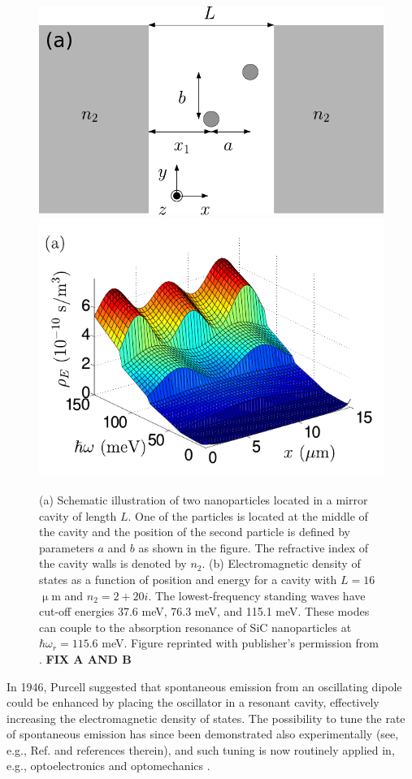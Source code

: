 \begin{figure}
 \includegraphics[width=.55\columnwidth]{pics/dipole_fig2.pdf}
 \includegraphics[width=.44\columnwidth]{pics/dipole_fig3a.pdf}
 \caption{(a) Schematic illustration of two nanoparticles located in a mirror cavity of length $L$. One of the particles is located at the middle of the cavity and the position of the second particle is defined by parameters $a$ and $b$ as shown in the figure. The refractive index of the cavity walls is denoted by $n_2$. (b) Electromagnetic density of states as a function of position and energy for a cavity with $L=16$ $\upmu$m and $n_2=2+20i$. The lowest-frequency standing waves have cut-off energies 37.6 meV, 76.3 meV, and 115.1 meV. These modes can couple to the absorption resonance of SiC nanoparticles at $\hbar\omega_r=115.6$ meV. Figure reprinted with publisher's permission from . \textbf{FIX A AND B}}
\label{fig:gfm_dipole_system}
\end{figure}


In 1946, Purcell \cite{purcell46} suggested that spontaneous emission from an oscillating dipole could be enhanced by placing the oscillator in a resonant cavity, effectively increasing the electromagnetic density of states. The possibility to tune the rate of spontaneous emission has since been demonstrated also experimentally (see, e.g., Ref. \cite{hulet85} and references therein), and such tuning is now routinely applied in, e.g., optoelectronics \cite{} and optomechanics \cite{}.

